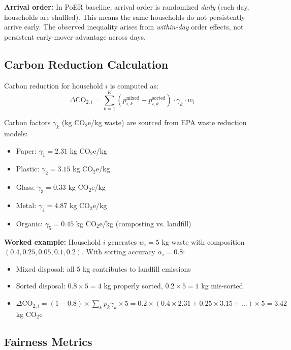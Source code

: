 \documentclass[12pt,a4paper]{article}
\begin{document}
\textbf{Arrival order:} In PoER baseline, arrival order is randomized \textit{daily} (each day, households are shuffled). This means the same households do not persistently arrive early. The observed inequality arises from \textit{within-day} order effects, not persistent early-mover advantage across days.

\subsection{Carbon Reduction Calculation}

Carbon reduction for household $i$ is computed as:
\begin{equation}
\Delta \text{CO}_{2,i} = \sum_{k=1}^K (p_{i,k}^{\text{mixed}} - p_{i,k}^{\text{sorted}}) \cdot \gamma_k \cdot w_i
\end{equation}

Carbon factors $\gamma_k$ (kg CO$_2$e/kg waste) are sourced from EPA waste reduction models\cite{epa2022waste}:
\begin{itemize}
    \item Paper: $\gamma_1 = 2.31$ kg CO$_2$e/kg
    \item Plastic: $\gamma_2 = 3.15$ kg CO$_2$e/kg
    \item Glass: $\gamma_3 = 0.33$ kg CO$_2$e/kg
    \item Metal: $\gamma_4 = 4.87$ kg CO$_2$e/kg
    \item Organic: $\gamma_5 = 0.45$ kg CO$_2$e/kg (composting vs. landfill)
\end{itemize}

\textbf{Worked example:} Household $i$ generates $w_i = 5$ kg waste with composition $(0.4, 0.25, 0.05, 0.1, 0.2)$. With sorting accuracy $\alpha_i = 0.8$:
\begin{itemize}
    \item Mixed disposal: all 5 kg contributes to landfill emissions
    \item Sorted disposal: $0.8 \times 5 = 4$ kg properly sorted, $0.2 \times 5 = 1$ kg mis-sorted
    \item $\Delta \text{CO}_{2,i} = (1 - 0.8) \times \sum_k p_k \gamma_k \times 5 = 0.2 \times (0.4 \times 2.31 + 0.25 \times 3.15 + \ldots) \times 5 = 3.42$ kg CO$_2$e
\end{itemize}

\subsection{Fairness Metrics}
\end{document}
